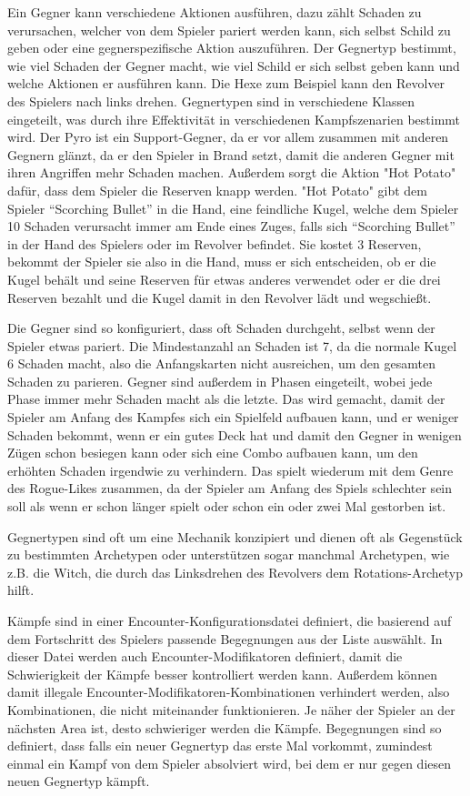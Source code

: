 Ein Gegner kann verschiedene Aktionen ausführen, dazu zählt Schaden zu verursachen, welcher von dem Spieler pariert
werden kann, sich selbst Schild zu geben oder eine gegnerspezifische Aktion auszuführen. Der Gegnertyp bestimmt,
wie viel Schaden der Gegner macht, wie viel Schild er sich selbst geben kann und welche Aktionen er ausführen kann.
Die Hexe zum Beispiel kann den Revolver des Spielers nach links drehen. Gegnertypen sind in verschiedene Klassen eingeteilt,
was durch ihre Effektivität in verschiedenen Kampfszenarien bestimmt wird. Der Pyro ist ein Support-Gegner, da er vor
allem zusammen mit anderen Gegnern glänzt, da er den Spieler in Brand setzt, damit die anderen Gegner mit ihren Angriffen
mehr Schaden machen. Außerdem sorgt die Aktion "Hot Potato" dafür, dass dem Spieler die Reserven knapp werden. "Hot Potato"
gibt dem Spieler “Scorching Bullet” in die Hand, eine feindliche Kugel, welche dem Spieler 10 Schaden verursacht immer am
Ende eines Zuges, falls sich “Scorching Bullet” in der Hand des Spielers oder im Revolver befindet. Sie kostet 3 Reserven,
bekommt der Spieler sie also in die Hand, muss er sich entscheiden, ob er die Kugel behält und seine Reserven für etwas anderes
verwendet oder er die drei Reserven bezahlt und die Kugel damit in den Revolver lädt und wegschießt.


Die Gegner sind so konfiguriert, dass oft Schaden durchgeht, selbst wenn der Spieler etwas pariert. Die Mindestanzahl
an Schaden ist 7, da die normale Kugel 6 Schaden macht, also die Anfangskarten nicht ausreichen, um den gesamten
Schaden zu parieren. Gegner sind außerdem in Phasen eingeteilt, wobei jede Phase immer mehr Schaden macht als die letzte.
Das wird gemacht, damit der Spieler am Anfang des Kampfes sich ein Spielfeld aufbauen kann, und er weniger Schaden bekommt,
wenn er ein gutes Deck hat und damit den Gegner in wenigen Zügen schon besiegen kann oder sich eine Combo aufbauen kann,
um den erhöhten Schaden irgendwie zu verhindern. Das spielt wiederum mit dem Genre des Rogue-Likes zusammen,
da der Spieler am Anfang des Spiels schlechter sein soll als wenn er schon länger spielt oder schon ein oder zwei Mal gestorben ist.


Gegnertypen sind oft um eine Mechanik konzipiert und dienen oft als Gegenstück zu bestimmten Archetypen oder unterstützen
sogar manchmal Archetypen, wie z.B. die Witch, die durch das Linksdrehen des Revolvers dem Rotations-Archetyp hilft.


Kämpfe sind in einer Encounter-Konfigurationsdatei definiert, die basierend auf dem Fortschritt des Spielers passende
Begegnungen aus der Liste auswählt. In dieser Datei werden auch Encounter-Modifikatoren definiert, damit die Schwierigkeit
der Kämpfe besser kontrolliert werden kann. Außerdem können damit illegale Encounter-Modifikatoren-Kombinationen verhindert
werden, also Kombinationen, die nicht miteinander funktionieren. Je näher der Spieler an der nächsten Area ist,
desto schwieriger werden die Kämpfe. Begegnungen sind so definiert, dass falls ein neuer Gegnertyp das erste Mal vorkommt,
zumindest einmal ein Kampf von dem Spieler absolviert wird, bei dem er nur gegen diesen neuen Gegnertyp kämpft.


